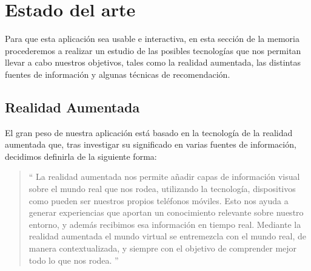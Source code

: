 
\cleardoublepage


\chapter{Estado del arte}
\label{makereference2}
Para que esta aplicación sea usable e interactiva, en esta sección de la memoria procederemos a 
realizar un estudio de las posibles tecnologías que nos permitan llevar a cabo nuestros objetivos, 
tales como la realidad aumentada, las distintas fuentes de información y algunas
técnicas de recomendación. 
\section{Realidad Aumentada}
\label{makereference2.1}
El gran peso de nuestra aplicación está basado en la tecnología de la realidad aumentada que, tras investigar su significado en varias fuentes de información,
decidimos definirla de la siguiente forma:
\begin{quote}
``
La realidad aumentada nos permite añadir capas de información visual sobre el 
mundo real que nos rodea, utilizando la tecnología, dispositivos como pueden ser 
nuestros propios teléfonos móviles. Esto nos ayuda a generar experiencias que aportan
un conocimiento relevante sobre nuestro entorno, y además recibimos esa información en 
tiempo real. Mediante la realidad aumentada el mundo virtual se entremezcla con el mundo 
real, de manera contextualizada, y siempre con el objetivo de comprender mejor todo lo que 
nos rodea.
''
\end{quote}


